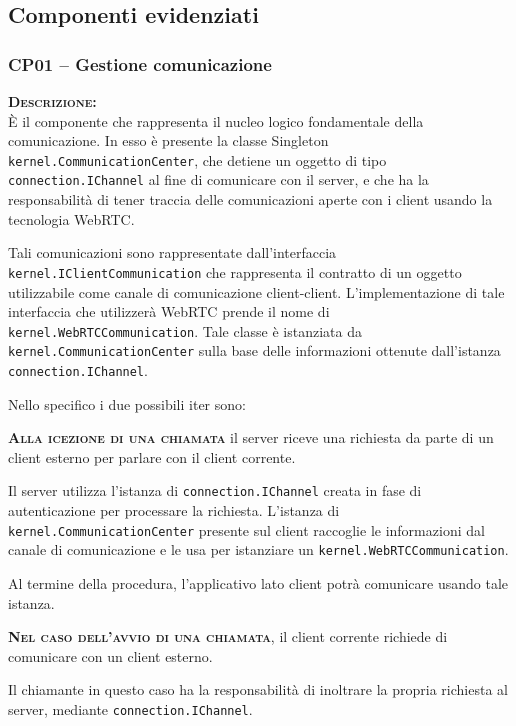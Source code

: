 \subsection{Componenti evidenziati}

\subsubsection{CP01 -- Gestione comunicazione}

\begin{description}
	\item{\scshape\bfseries Descrizione:}\\
È il componente che rappresenta il nucleo logico fondamentale della comunicazione. In esso è presente la classe Singleton \texttt{kernel.CommunicationCenter}, che detiene un oggetto di tipo \texttt{connection.IChannel} al fine di comunicare con il server, e che ha la responsabilità di tener traccia delle comunicazioni aperte con i client usando la tecnologia WebRTC\@.

Tali comunicazioni sono rappresentate dall'interfaccia \texttt{kernel.IClientCommunication} che rappresenta il contratto di un oggetto utilizzabile come canale di comunicazione client-client. L'implementazione di tale interfaccia che utilizzerà WebRTC prende il nome di \texttt{kernel.WebRTCCommunication}. Tale classe è istanziata da \texttt{kernel.CommunicationCenter} sulla base delle informazioni ottenute dall'istanza \texttt{connection.IChannel}. 

Nello specifico i due possibili iter sono:
\begin{description}
	\item{\bfseries\scshape Alla icezione di una chiamata} il server riceve una richiesta da parte di un client esterno per parlare con il client corrente.
	
Il server utilizza l'istanza di \texttt{connection.IChannel} creata in fase di autenticazione per processare la richiesta. L'istanza di \texttt{kernel.CommunicationCenter} presente sul client raccoglie le informazioni dal canale di comunicazione e le usa per istanziare un \texttt{kernel.WebRTCCommunication}.

Al termine della procedura, l'applicativo lato client potrà comunicare usando tale istanza.
	\item{\bfseries\scshape Nel caso dell'avvio di una chiamata}, il client corrente richiede di comunicare con un client esterno.
	
Il chiamante in questo caso ha la responsabilità di inoltrare la propria richiesta al server, mediante \texttt{connection.IChannel}.


\end{description}
\end{description}
